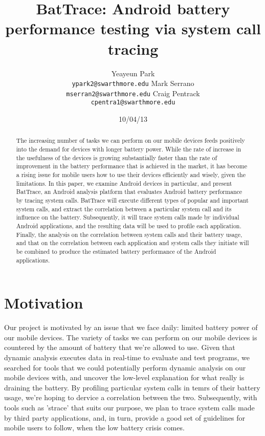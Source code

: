 \documentclass[11pt]{article}
\title{BatTrace: Android battery performance testing via system call tracing}
\author{Yeayeun Park\\
  {\tt ypark2@swarthmore.edu}  
  \And                           
  Mark Serrano\\
  {\tt mserran2@swarthmore.edu}
  \And                            
  Craig Pentrack\\                 
  {\tt cpentra1@swarthmore.edu}}
\date{10/04/13}
\begin{document}
\maketitle
\begin{abstract}
  The increasing number of tasks we can perform on our mobile devices 
  feeds positively into the demand for devices with longer battery power. 
  While the rate of increase in the usefulness of the devices is 
  growing substantially faster than the rate of improvement in the battery 
  performance that is achieved in the market, it has become a rising issue 
  for mobile users how to use their devices efficiently and wisely, given 
  the limitations. In this paper, we examine Android devices in particular, 
  and present BatTrace, an Android analysis platform that evaluates Android 
  battery performance by tracing system calls. BatTrace will execute 
  different types of popular and important system calls, and extract the 
  correlation between a particular system call and its influence on the 
  battery. Subsequently, it will trace system calls made by individual Android 
  applications, and the resulting data will be used to profile each application. 
  Finally, the analysis on the correlation between system calls and their 
  battery usage, and that on the correlation between each application and system 
  calls they initiate will be combined to produce the estimated battery performance 
  of the Android applications.
\end{abstract}

\section{Motivation}

Our project is motivated by an issue that we face daily: limited battery power 
of our mobile devices. The variety of tasks we can perform on our mobile
devices is countered by the amount of battery that we're allowed to use. Given 
that dynamic analysis executes data in real-time to evaluate and test programs, 
we searched for tools that we could potentially perform dynamic analysis on our 
mobile devices with, and uncover the low-level explanation for what really is 
draining the battery. By profiling particular system calls in temrs of their battery
usage, we're hoping to dervice a correlation between the two. Subsequently, with tools 
such as 'strace' that suits our purpose, we plan to trace system calls made by third 
party applications, and, in turn, provide a good set of guidelines for mobile users 
to follow, when the low battery crisis comes.
\end{document}
